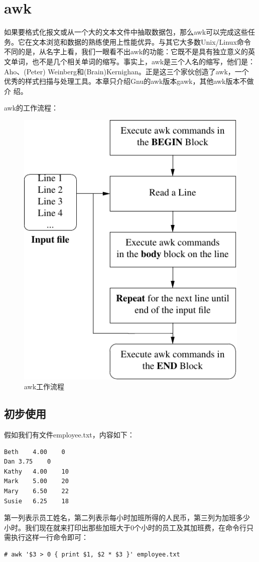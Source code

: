 \section{awk}
\label{sec:awk}

如果要格式化报文或从一个大的文本文件中抽取数据包，那么awk可以完成这些任
务。它在文本浏览和数据的熟练使用上性能优异。与其它大多数Unix/Linux命令
不同的是，从名字上看，我们一眼看不出awk的功能：它既不是具有独立意义的英
文单词，也不是几个相关单词的缩写。事实上，awk是三个人名的缩写，他们是：
Aho、(Peter) Weinberg和(Brain)Kernighan。正是这三个家伙创造了awk，一个
优秀的样式扫描与处理工具。本章只介绍Gnu的awk版本gawk，其他awk版本不做介
绍。

awk的工作流程：
\begin{figure}[!htbp]
  \centering
  \includegraphics[width=.5\textwidth]{graph/awk_workflow.pdf}
  \caption{awk工作流程}
  \label{fig:awk_workflow}
\end{figure}

\subsection{初步使用}
\label{subsec:FirstAwk}

假如我们有文件employee.txt，内容如下：

\begin{verbatim}
Beth	4.00	0
Dan	3.75	0
Kathy	4.00	10
Mark	5.00	20
Mary	6.50	22
Susie	6.25	18
\end{verbatim}

第一列表示员工姓名，第二列表示每小时加班所得的人民币，第三列为加班多少
小时。我们现在就来打印出那些加班大于0个小时的员工及其加班费，在命令行只
需执行这样一行命令即可：

\begin{verbatim}
# awk '$3 > 0 { print $1, $2 * $3 }' employee.txt
\end{verbatim}

